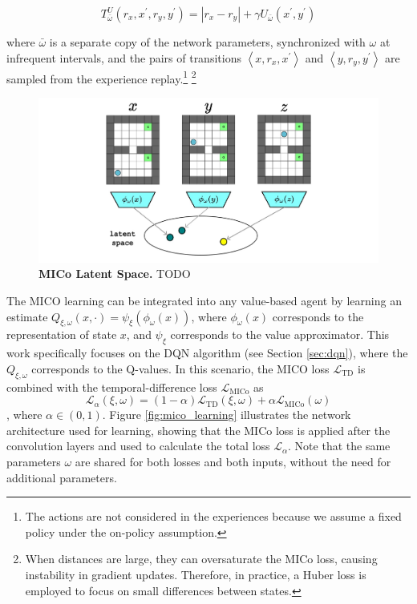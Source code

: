 \begin{equation}
    T_{\bar{\omega}}^U\left(r_x, x^{\prime}, r_y, y^{\prime}\right)=\left|r_x-r_y\right|+\gamma U_{\bar{\omega}}\left(x^{\prime}, y^{\prime}\right)
\end{equation}

where \(\bar{\omega}\) is a separate copy of the network parameters, synchronized with \(\omega\) at infrequent intervals, and the pairs of transitions \(\left\langle x, r_x, x^{\prime}\right\rangle\) and \(\left\langle y, r_y, y^{\prime}\right\rangle\) are sampled from the experience replay.\footnote{The actions are not considered in the experiences because we assume a fixed policy under the on-policy assumption.} \footnote{When distances are large, they can oversaturate the MICo loss, causing instability in gradient updates. Therefore, in practice, a Huber loss is employed to focus on small differences between states.}

\begin{figure}[H]
    \centering
    \includegraphics[width=1\linewidth]{Figures/latent_space.jpg}
    \caption[MICo Latent Space]{\textbf{MICo Latent Space.} TODO}
    \label{fig:latent_space}
\end{figure}

The MICO learning can be integrated into any value-based agent by learning an estimate $Q_{\xi, \omega}(x, \cdot) = \psi_\xi(\phi_\omega(x))$, where $\phi_\omega(x)$ corresponds to the representation of state $x$, and $\psi_\xi$ corresponds to the value approximator. This work specifically focuses on the DQN algorithm (see Section \ref{sec:dqn}), where the $Q_{\xi, \omega}$ corresponds to the Q-values. In this scenario, the MICO loss $\mathcal{L}_{\text{TD}}$ is combined with the temporal-difference loss $\mathcal{L}_{\text{MICo}}$ as 
\begin{equation}
    \mathcal{L}_\alpha(\xi, \omega) = (1 - \alpha)\mathcal{L}_{\text{TD}}(\xi, \omega) + \alpha \mathcal{L}_{\text{MICo}}(\omega)
\end{equation}
, where $\alpha \in (0, 1)$. 
Figure \ref{fig:mico_learning} illustrates the network architecture used for learning, showing that the MICo loss is applied after the convolution layers and used to calculate the total loss $\mathcal{L}_\alpha$. Note that the same parameters $\omega$ are shared for both losses and both inputs, without the need for additional parameters.

